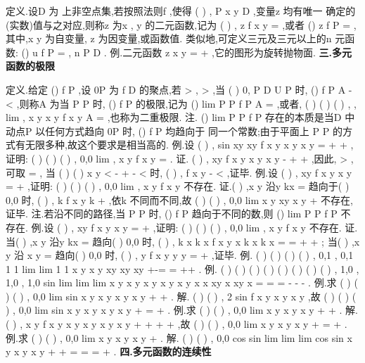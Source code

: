\textcolor{lyred}{定义}.设D 为
上非空点集,若按照法则f ,使得
(
)
,
P x y
D
\forall 
\in 
,变量z 均有唯一 
确定的(实数)值与之对应,则称z 为x , y 的\textcolor{lyred}{二元函数},记为
(
)
,
z
f x y
=
,或者 
()
z
f P
=
,其中,x y 为\textcolor{lyred}{自变量}, z 为\textcolor{lyred}{因变量},或函数值. 
类似地,可定义三元及三元以上的\textcolor{lyred}{n 元函数}:
()
u
f P
=
,
n
P
D
\in 
\subset {}. 
\textcolor{lyred}{例}.二元函数
z
x
y
=
+
,它的图形为旋转抛物面. 
\vspace{4pt}
{\bfseries \textcolor{lyred}{三.多元函数的极限}}

\textcolor{lyred}{定义}.给定
()
f P ,设
0P 为
f
D 的聚点,若
\varepsilon 
\forall 
>
,
\delta 
\exists 
>
,当
(
)
0,
P
D
U P \delta 
\in 
\cap 
\circ 
时, 
()
f P
A
\varepsilon 
-
<
,则称A 为当
P
P
\to 
时,
()
f P 的\textcolor{lyred}{极限},记为
()
lim
P
P f P
A
\to 
=
,或者, 
(
)
(
)
(
)
,
,
lim
,
x y
x
y
f
x y
A
\to 
=
,也称为\textcolor{lyred}{二重极限}. 
\textcolor{lyred}{注}.
()
lim
P
P f P
\to 
存在的本质是当D 中动点P 以任何方式趋向
0P 时,
()
f P 均趋向于 
同一个常数;由于平面上
P
P
\to 
的方式有无限多种,故这个要求是相当高的. 
\textcolor{lyred}{例}.设
(
)
,
sin
xy
xy
f x y
x
y
x
y
=
+
+
,证明:
(
)
(
)
(
)
,
0,0
lim
,
x y
f x y
\to 
=
. 
证.
(
)
,
xy
f x y
x
y
x
y
-
\le 
\le 
+
+
,因此,
\varepsilon 
\forall 
>
,可取
\delta 
\varepsilon 
=
, 
当
(
)
(
)
x
y
\delta 
<
-
+
-
<
时,
(
)
,
f x y
\varepsilon 
-
<
,证毕. 
\textcolor{lyred}{例}.设
(
)
,
xy
f x y
x
y
=
+
,证明:
(
)
(
)
(
)
,
0,0
lim
,
x y
f x y
\to 
不存在. 
证.(
)
,x y 沿y
kx
=
趋向于(
)
0,0 时,
(
)
,
k
f x y
k
\to +
,依k 不同而不同,故 
(
)
(
)
,
0,0
lim
x y
xy
x
y
\to 
+
不存在,证毕. 
\textcolor{lyred}{注}.若沿不同的路径,当
P
P
\to 
时,
()
f P 趋向于不同的数,则
()
lim
P
P f P
\to 
不存在. 
\textcolor{lyred}{例}.设
(
)
,
xy
f x y
x
y
=
+
,证明:
(
)
(
)
(
)
,
0,0
lim
,
x y
f x y
\to 
不存在. 
证.当(
)
,x y 沿y
kx
=
趋向(
)
0,0 时,
(
)
,
k x
k x
f x y
x
k x
k x
=
=
\to 
+
+
; 
当(
)
,x y 沿
x
y
=
趋向(
)
0,0 时,
(
)
,
y
f x y
y
y
=
\to 
+
,证毕. 
\textcolor{lyred}{例}.
(
)
(
)
(
)
(
)
,
0,1
,
0,1
1 1
lim
lim
1 1
x y
x y
xy
xy
xy
\to 
\to 
+-=
=
++
. 
\textcolor{lyred}{例}.
(
)
(
)
(
)
(
)
(
)
(
)
(
)
(
)
,
1,0
,
1,0
,
1,0
sin
lim
lim
lim
x y
x y
x y
x y
x y
x
x
xy
x
xy
x
\to 
\to 
\to 
=
=
=
-
-
-
. 
\textcolor{lyred}{例}.求
(
)
(
)
(
)
,
0,0
lim
sin
x y
x
y
x y
x
y
\to 
+
+
. 
解.
(
)
(
)
,
2 sin
f x y
x y
x y
\le 
\le 
\le 
,故
(
)
(
)
(
)
,
0,0
lim
sin
x y
x
y
x y
x
y
\to 
+
=
+
. 
\textcolor{lyred}{例}.求
(
)
(
)
,
0,0
lim
x y
x
y
x
y
\to 
+
+
. 
解.
(
)
,
x
y
f x y
x
y
x
y
x
y
x
y
\le 
\cdots 
+
\cdots 
\le 
+
+
+
,故
(
)
(
)
,
0,0
lim
x y
x
y
x
y
\to 
+
=
+
. 
\textcolor{lyred}{例}.求
(
)
(
)
,
0,0
lim
x y
x y
x
y
\to 
+
. 
解.
(
)
(
)
,
0,0
cos
sin
lim
lim
lim
cos
sin
x y
x y
x
y
\rho 
\rho 
\rho 
\theta 
\theta 
\rho 
\theta 
\theta 
\rho 
+
+
\to 
\to 
\to 
=
=
=
+
. 
\vspace{4pt}
{\bfseries \textcolor{lyred}{四.多元函数的连续性}}

